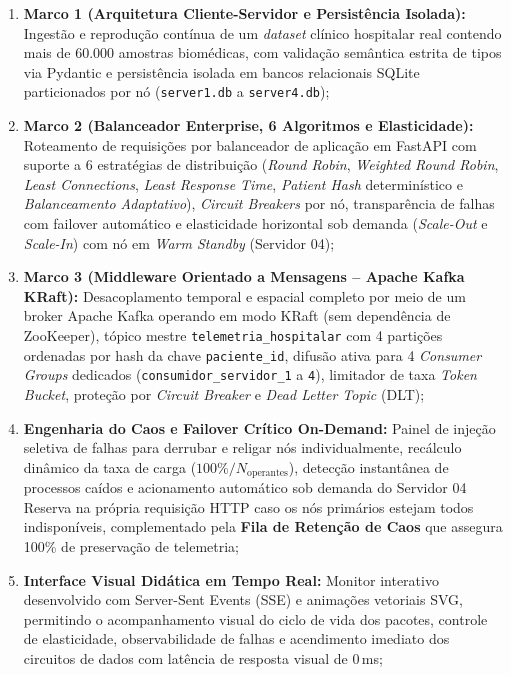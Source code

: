 \documentclass[12pt,a4paper]{article}
\begin{document}
\begin{enumerate}
	\item \textbf{Marco 1 (Arquitetura Cliente-Servidor e Persistência Isolada):} Ingestão e reprodução contínua de um \textit{dataset} clínico hospitalar real contendo mais de 60.000 amostras biomédicas, com validação semântica estrita de tipos via Pydantic e persistência isolada em bancos relacionais SQLite particionados por nó (\texttt{server1.db} a \texttt{server4.db});
	\item \textbf{Marco 2 (Balanceador Enterprise, 6 Algoritmos e Elasticidade):} Roteamento de requisições por balanceador de aplicação em FastAPI com suporte a 6 estratégias de distribuição (\textit{Round Robin}, \textit{Weighted Round Robin}, \textit{Least Connections}, \textit{Least Response Time}, \textit{Patient Hash} determinístico e \textit{Balanceamento Adaptativo}), \textit{Circuit Breakers} por nó, transparência de falhas com failover automático e elasticidade horizontal sob demanda (\textit{Scale-Out} e \textit{Scale-In}) com nó em \textit{Warm Standby} (Servidor 04);
	\item \textbf{Marco 3 (Middleware Orientado a Mensagens -- Apache Kafka KRaft):} Desacoplamento temporal e espacial completo por meio de um broker Apache Kafka operando em modo KRaft (sem dependência de ZooKeeper), tópico mestre \texttt{telemetria\_hospitalar} com 4 partições ordenadas por hash da chave \texttt{paciente\_id}, difusão ativa para 4 \textit{Consumer Groups} dedicados (\texttt{consumidor\_servidor\_1} a \texttt{4}), limitador de taxa \textit{Token Bucket}, proteção por \textit{Circuit Breaker} e \textit{Dead Letter Topic} (DLT);
	\item \textbf{Engenharia do Caos e Failover Crítico On-Demand:} Painel de injeção seletiva de falhas para derrubar e religar nós individualmente, recálculo dinâmico da taxa de carga ($100\% / N_{\text{operantes}}$), detecção instantânea de processos caídos e acionamento automático sob demanda do Servidor 04 Reserva na própria requisição HTTP caso os nós primários estejam todos indisponíveis, complementado pela \textbf{Fila de Retenção de Caos} que assegura 100\% de preservação de telemetria;
	\item \textbf{Interface Visual Didática em Tempo Real:} Monitor interativo desenvolvido com Server-Sent Events (SSE) e animações vetoriais SVG, permitindo o acompanhamento visual do ciclo de vida dos pacotes, controle de elasticidade, observabilidade de falhas e acendimento imediato dos circuitos de dados com latência de resposta visual de 0\,ms;

\end{enumerate}
\end{document}
